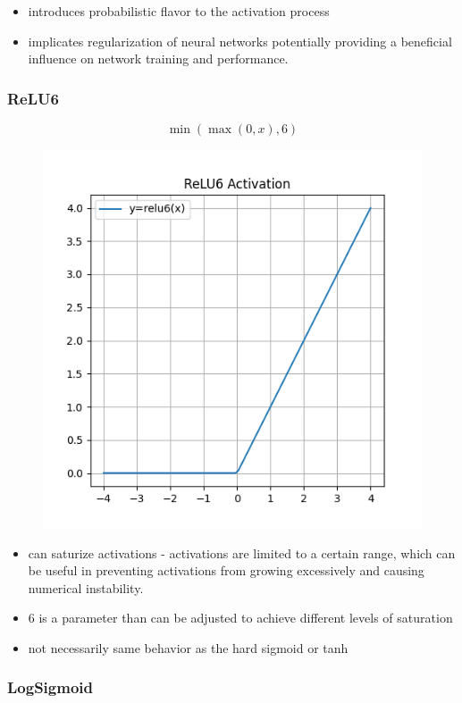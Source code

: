 \documentclass[11pt]{article}
\begin{document}
\begin{itemize}
    \item introduces probabilistic flavor to the activation process
    \item implicates regularization of neural networks potentially providing a  beneficial influence on network training and performance.
\end{itemize}

\subsubsection{ReLU6}

\begin{definition}\label{eq:activation-relu6}
    \begin{equation*}
        \min(\max(0,x),6)
    \end{equation*}
\end{definition}

\begin{figure}[H]
    \centering
    \includegraphics*[width=.4\linewidth]{figures/ReLU6 Activation.png}\label{fig:relu6}
\end{figure}

\begin{itemize}
    \item can saturize activations - activations are limited to a certain range, which can be useful in preventing activations from growing excessively and causing numerical instability.
    \item 6 is a parameter than can be adjusted to achieve different levels of saturation
    \item not necessarily same behavior as the hard sigmoid or tanh 
\end{itemize}

\subsubsection{LogSigmoid}
\end{document}
